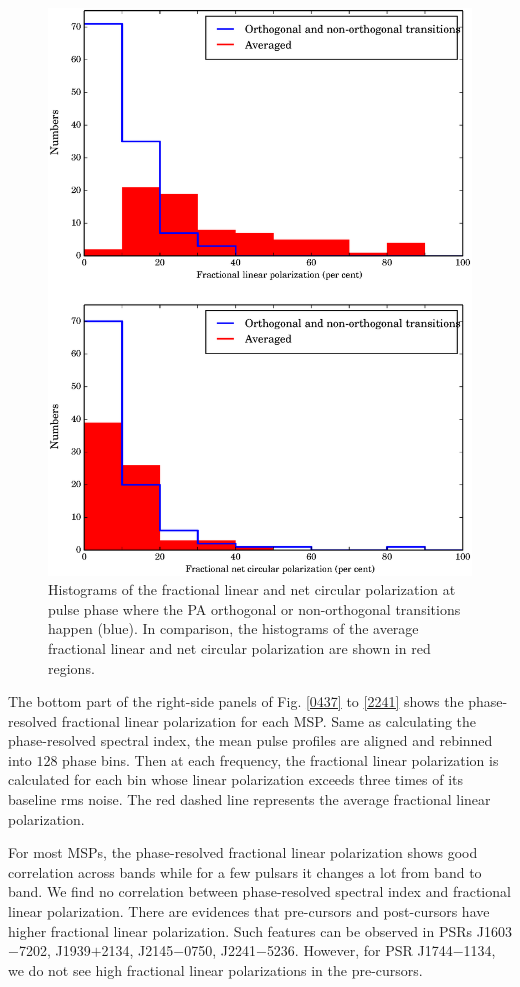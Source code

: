 \documentclass[useAMS,usenatbib]{mn2e}
\begin{document}
\begin{figure}
\begin{center}
\includegraphics[width=2.9 in]{psr_jump.ps}
\caption{Histograms of the fractional linear and net circular polarization 
at pulse phase where the PA orthogonal or non-orthogonal transitions happen (blue).
In comparison, the histograms of the average fractional linear and net circular 
polarization are shown in red regions.}
\label{tranHist}
\end{center}
\end{figure}

The bottom part of the right-side panels of Fig. \ref{0437} to \ref{2241} shows the 
phase-resolved fractional linear polarization for each MSP. 
%
Same as calculating the phase-resolved spectral index, the mean pulse profiles 
are aligned and rebinned into $128$ phase bins. 
%
Then at each frequency, the fractional linear polarization is calculated for each 
bin whose linear polarization exceeds three times of its baseline rms noise.
%
The red dashed line represents the average fractional linear polarization. 
%

For most MSPs, the phase-resolved fractional linear polarization shows good 
correlation across bands while for a few pulsars it changes a lot from 
band to band.
%
We find no correlation between phase-resolved spectral index and fractional 
linear polarization. 
%
There are evidences that pre-cursors and post-cursors have higher fractional 
linear polarization. Such features can be observed in PSRs J1603$-$7202, 
J1939$+$2134, J2145$-$0750, J2241$-$5236. 
%
However, for PSR J1744$-$1134, we do not see high fractional linear polarizations 
in the pre-cursors.
%
\end{document}
